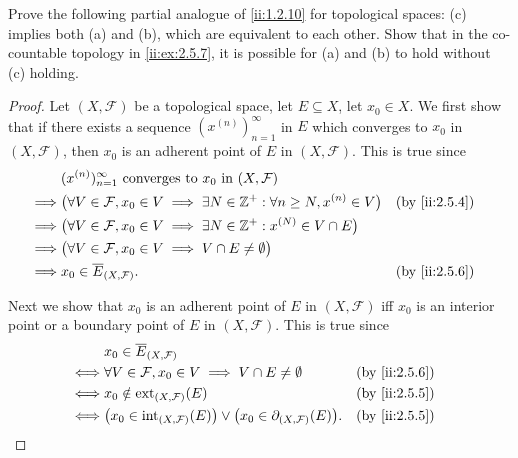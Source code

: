 \begin{ex}\label{ii:ex:2.5.10}
  Prove the following partial analogue of \cref{ii:1.2.10} for topological spaces:
  (c) implies both (a) and (b), which are equivalent to each other.
  Show that in the co-countable topology in \cref{ii:ex:2.5.7}, it is possible for (a) and (b) to hold without (c) holding.
\end{ex}

\begin{proof}
  Let \((X, \mathcal{F})\) be a topological space, let \(E \subseteq X\), let \(x_0 \in X\).
  We first show that if there exists a sequence \((x^{(n)})_{n = 1}^\infty\) in \(E\) which converges to \(x_0\) in \((X, \mathcal{F})\), then \(x_0\) is an adherent point of \(E\) in \((X, \mathcal{F})\).
  This is true since
  \begin{align*}
             & (x^{(n)})_{n = 1}^\infty \text{ converges to } x_0 \text{ in } (X, \mathcal{F})                                              \\
    \implies & \big(\forall V \in \mathcal{F}, x_0 \in V \implies \exists N \in \Z^+ : \forall n \geq N, x^{(n)} \in V\big) &  & \by{ii:2.5.4} \\
    \implies & \big(\forall V \in \mathcal{F}, x_0 \in V \implies \exists N \in \Z^+ : x^{(N)} \in V \cap E\big)                            \\
    \implies & \big(\forall V \in \mathcal{F}, x_0 \in V \implies V \cap E \neq \emptyset\big)                                              \\
    \implies & x_0 \in \overline{E}_{(X, \mathcal{F})}.                                                                     &  & \by{ii:2.5.6}
  \end{align*}

  Next we show that \(x_0\) is an adherent point of \(E\) in \((X, \mathcal{F})\) iff \(x_0\) is an interior point or a boundary point of \(E\) in \((X, \mathcal{F})\).
  This is true since
  \begin{align*}
         & x_0 \in \overline{E}_{(X, \mathcal{F})}                                                                                   \\
    \iff & \forall V \in \mathcal{F}, x_0 \in V \implies V \cap E \neq \emptyset                                     &  & \by{ii:2.5.6} \\
    \iff & x_0 \notin \text{ext}_{(X, \mathcal{F})}(E)                                                               &  & \by{ii:2.5.5} \\
    \iff & \big(x_0 \in \text{int}_{(X, \mathcal{F})}(E)\big) \lor \big(x_0 \in \partial_{(X, \mathcal{F})}(E)\big). &  & \by{ii:2.5.5}
  \end{align*}


\end{proof}
